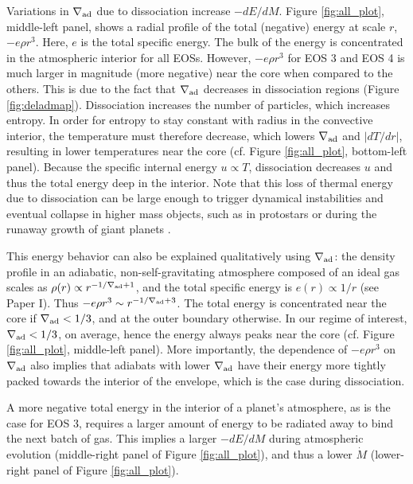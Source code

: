 \documentclass[apj]{emulateapj}
\newcommand{\delad}{\nabla_{\rm ad}}
\begin{document}
Variations in $\delad$ due to dissociation increase $-dE/dM$. Figure \ref{fig:all_plot}, middle-left panel, shows a radial profile of the total (negative) energy at scale $r$, $-e \rho r^3$. Here, $e$ is the total specific energy.   %
The bulk of the energy is concentrated in the atmospheric interior for all EOSs. However, $-e \rho r^3$ for EOS 3 and EOS 4 is much larger in magnitude (more negative) near the core when compared to the others. This is due to the fact that $\delad$ decreases in dissociation regions (Figure \ref{fig:deladmap}). Dissociation increases the number of particles, which increases entropy. In order for entropy to stay constant with radius in the convective interior, the temperature must therefore decrease, which lowers $\delad$ and $|dT/dr|$, resulting in lower temperatures near the core (cf. Figure \ref{fig:all_plot}, bottom-left panel). Because  the specific internal energy $u \propto T$, dissociation decreases $u$ and thus the total energy deep in the interior.  Note that this loss of thermal energy due to dissociation can be large enough to trigger dynamical instabilities and eventual collapse in higher mass objects, such as in protostars \citep{larson69} or during the runaway growth of giant planets \citep{bodenheimer80}.  



This energy behavior can also be explained qualitatively using $\delad$: the density profile in an adiabatic, non-self-gravitating atmosphere composed of an ideal gas scales as $\rho(r) \propto r^{-1/\delad+1}$, and the total specific energy is $e(r) \propto 1/r$ (see Paper I). Thus $- e \rho r^3 \sim r^{-1/\delad+3}$. The total energy is concentrated near the core if $\delad<1/3$, and at the outer boundary otherwise. In our regime of interest, $\delad<1/3$, on average, hence the energy always peaks near the core (cf. Figure \ref{fig:all_plot}, middle-left panel). More importantly, the dependence of $-e \rho r^3$ on $\delad$ also implies that adiabats with lower $\delad$ have their energy more tightly packed towards the interior of the envelope, which is the case during dissociation. 

A more negative total energy in the interior of a planet's atmosphere, as is the case for EOS 3, requires a larger amount of energy to be radiated away to bind the next batch of gas. This implies a larger $-dE/dM$ during atmospheric evolution (middle-right panel of Figure \ref{fig:all_plot}), and thus a lower $\dot{M}$ (lower-right panel of Figure \ref{fig:all_plot}). 
\end{document}
